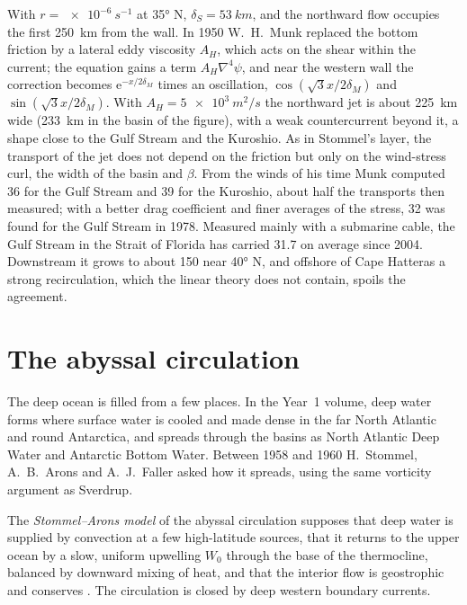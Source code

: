 With $r = \qty{e-6}{s^{-1}}$ at \ang{35} N, $\delta_S = \qty{53}{km}$, and
the northward flow occupies the first \qty{250}{km} from the wall. In 1950
W.~H.~Munk replaced the bottom friction by a lateral eddy viscosity $A_H$,
which acts on the shear within the current; the equation gains a term
$A_H\nabla^4\psi$, and near the western wall the correction becomes
$\mathrm e^{-x/2\delta_M}$ times an oscillation, $\cos(\sqrt3x/2\delta_M)$
and $\sin(\sqrt3x/2\delta_M)$. With $A_H = \qty{5e3}{m^2/s}$ the northward
jet is about \qty{225}{km} wide (\qty{233}{km} in the basin of the figure),
with a weak countercurrent beyond it, a shape close to the Gulf Stream and
the Kuroshio. As in Stommel's layer, the transport of the jet does not
depend on the friction but only on the wind-stress curl, the width of the
basin and $\beta$. From the winds of his time Munk computed
\qty{36}{\sverdrup} for the Gulf Stream and \qty{39}{\sverdrup} for the
Kuroshio, about half the transports then measured; with a better drag
coefficient and finer averages of the stress, \qty{32}{\sverdrup} was found
for the Gulf Stream in 1978. Measured mainly with a submarine cable, the
Gulf Stream in the Strait of Florida has carried \qty{31.7}{\sverdrup} on
average since 2004. Downstream it grows to about \qty{150}{\sverdrup} near
\ang{40} N, and offshore of Cape Hatteras a strong recirculation, which the
linear theory does not contain, spoils the agreement.

\section{The abyssal circulation}\label{sec:b3:ocean-dynamics:abyssal}

The deep ocean is filled from a few places. In the Year~1 volume, deep
water forms where surface water is cooled and made dense in the far North
Atlantic and round Antarctica, and spreads through the basins as North
Atlantic Deep Water and Antarctic Bottom Water. Between 1958 and 1960
H.~Stommel, A.~B.~Arons and A.~J.~Faller asked how it spreads, using the
same vorticity argument as Sverdrup.

\begin{definition}\label{def:b3:ocean-dynamics:abyssal}
The \emph{Stommel--Arons model} of the abyssal
circulation supposes that deep water is supplied by convection at a few
high-latitude sources, that it returns to the upper ocean by a slow, uniform
upwelling $W_0$ through the base of the thermocline, balanced by downward
mixing of heat, and that the interior flow is geostrophic and conserves
. The circulation is closed by deep western boundary
currents.
\end{definition}

